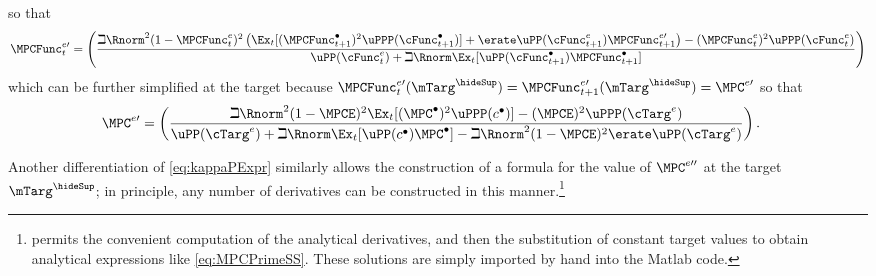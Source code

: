 \documentclass{\handout}
\begin{document}
so that
\begin{equation}\begin{gathered}\begin{aligned}
\MPCFunc^{e\prime}_{t}   & =  \left(\frac{\beth \Rnorm^{2} (1-\MPCFunc^{e}_{t})^{2} \left( \Ex_{t}[(\MPCFunc_{t+1}^{\bullet})^{2}\uPPP(\cFunc^{\bullet}_{t+1})] +\erate \uPP(\cFunc^{e}_{t+1}) \MPCFunc^{e \prime}_{t+1}\right)-(\MPCFunc^{e}_{t})^{2} \uPPP(\cFunc^{e}_{t})}{\uPP(\cFunc^{e}_{t})+\beth \Rnorm \Ex_{t}[\uPP(\cFunc^{\bullet}_{t+1})\MPCFunc^{\bullet}_{t+1}]  }\right) \nonumber \\ \label{eq:kappaPReverse}
\end{aligned}\end{gathered}\end{equation}
which can be further simplified at the target because $\MPCFunc^{e \prime}_{t}(\mTarg^{\hideSup}) = \MPCFunc^{e \prime}_{t+1}(\mTarg^{\hideSup}) = \MPC^{e \prime}$ so that
\begin{equation}\begin{gathered}\begin{aligned}
\MPC^{e\prime} & =  \left(\frac{\beth \Rnorm^{2} (1-\MPCE)^{2}\Ex_{t}[(\MPC^{\bullet})^{2} \uPPP(c^{\bullet})] -(\MPCE)^{2} \uPPP(\cTarg^{e})}{\uPP(\cTarg^{e}) + \beth \Rnorm \Ex_{t}[\uPP(c^{\bullet})\MPC^{\bullet}]- \beth \Rnorm^{2} (1-\MPCE)^{2}\erate \uPP(\cTarg^{e})}\right) \label{eq:MPCPrimeSS}
.
\end{aligned}\end{gathered}\end{equation}

Another differentiation of \eqref{eq:kappaPExpr} similarly allows the construction of a formula for the value of $\MPC^{e \prime\prime}$ at the target $\mTarg^{\hideSup}$; in principle, any number of derivatives can be 
constructed in this manner.\footnote{\Mma permits the convenient computation of the analytical derivatives, and then the substitution of constant target values to obtain analytical expressions like \eqref{eq:MPCPrimeSS}.  These solutions are simply imported by hand into the Matlab code.}
\end{document}
